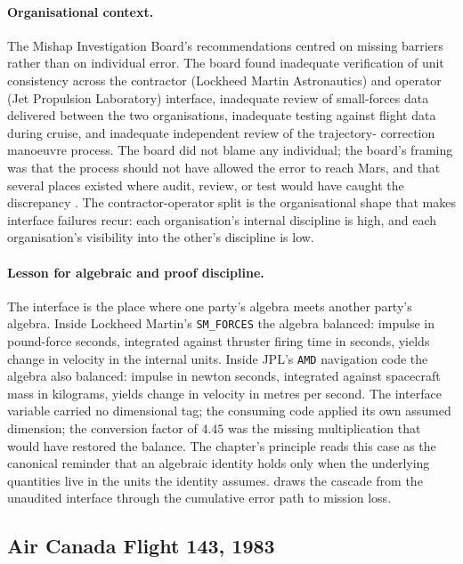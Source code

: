 \paragraph{Organisational context.}
The Mishap Investigation Board's recommendations centred on missing
barriers rather than on individual error. The board found inadequate
verification of unit consistency across the contractor (Lockheed
Martin Astronautics) and operator (Jet Propulsion Laboratory)
interface, inadequate review of small-forces data delivered between
the two organisations, inadequate testing against flight data during
cruise, and inadequate independent review of the trajectory-
correction manoeuvre process. The board did not blame any
individual; the board's framing was that the process should not have
allowed the error to reach Mars, and that several places existed
where audit, review, or test would have caught the discrepancy
\cite{acc:nasa-mco-mib}. The contractor-operator split is the
organisational shape that makes interface failures recur: each
organisation's internal discipline is high, and each organisation's
visibility into the other's discipline is low.

\paragraph{Lesson for algebraic and proof discipline.}
The interface is the place where one party's algebra meets another
party's algebra. Inside Lockheed Martin's \texttt{SM\_FORCES} the
algebra balanced: impulse in pound-force seconds, integrated against
thruster firing time in seconds, yields change in velocity in the
internal units. Inside JPL's \texttt{AMD} navigation code the algebra
also balanced: impulse in newton seconds, integrated against
spacecraft mass in kilograms, yields change in velocity in metres
per second. The interface variable carried no dimensional tag; the
consuming code applied its own assumed dimension; the conversion
factor of $4.45$ was the missing multiplication that would have
restored the balance. The chapter's principle reads this case as the
canonical reminder that an algebraic identity holds only when the
underlying quantities live in the units the identity assumes.
 draws the cascade from the
unaudited interface through the cumulative error path to mission
loss.



\subsection{Air Canada Flight 143, 1983}

